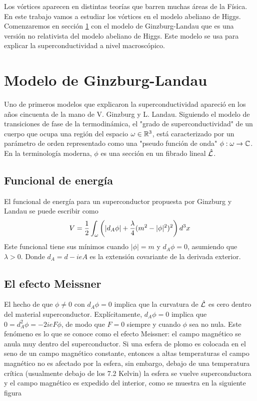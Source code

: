 Los vórtices aparecen en distintas teorías que barren muchas áreas de la Física. En este trabajo vamos a estudiar los vórtices en el modelo abeliano de Higgs. Comenzaremos en sección \ref{sec:1.1} con el modelo de Ginzburg-Landau que es una versión no relativista del modelo abeliano de Higgs. Este modelo se usa para explicar la superconductividad a nivel macroscópico.

\section{Modelo de Ginzburg-Landau}\label{sec:1.1}

Uno de primeros modelos que explicaron la superconductividad apareció en los años cincuenta de la mano de V. Ginzburg y L. Landau.  Siguiendo el modelo de transiciones de fase de la termodinámica, el "grado de superconductividad" de un cuerpo que ocupa una región del espacio $\omega\in\mathbb{R}^3$, está caracterizado por un parámetro de orden representado como una "pseudo función de onda" $\phi:\omega\rightarrow\mathbb{C}$. En la terminología moderna, $\phi$ es una sección en un fibrado lineal $\hat{\mathcal{L}}$.

\subsection{Funcional de energía}

El funcional de energía para un superconductor propuesta por Ginzburg y Landau se puede escribir como
\begin{align}
  V = \frac{1}{2}\int_\omega\left(|d_A \phi|+\frac{\lambda}{4}(m^2-|\phi|^2)^2\right)d^3x \label{eq:1} 
\end{align}
Este funcional tiene sus mínimos cuando $|\phi|=m$ y $d_A\phi=0$, asumiendo que $\lambda>0$. Donde $d_A=d-ieA$ es la extensión covariante de la derivada exterior.

\subsection{El efecto Meissner}

El hecho de que $\phi\neq 0$ con $d_A\phi=0$ implica que la curvatura de $\hat{\mathcal{L}}$ es cero dentro del material superconductor. Explícitamente, $d_A\phi=0$ implica que $0=d_A^2\phi=-2ieF\phi$, de modo que $F=0$ siempre y cuando $\phi$ sea no nula. Este fenómeno es lo que se conoce como el efecto Meissner: el campo magnético se anula muy dentro del superconductor. Si una esfera de plomo es colocada en el seno de un campo magnético constante, entonces a altas temperaturas el campo magnético no es afectado por la esfera, sin embargo, debajo de una temperatura crítica (usualmente debajo de los 7.2 Kelvin) la esfera se vuelve superconductora y el campo magnético es expedido del interior, como se muestra en la siguiente figura

